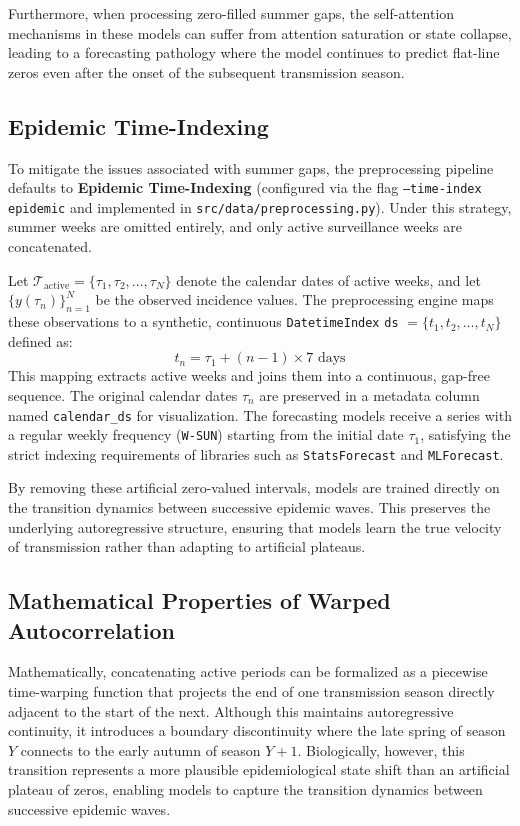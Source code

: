 Furthermore, when processing zero-filled summer gaps, the self-attention mechanisms in these models can suffer from attention saturation or state collapse, leading to a forecasting pathology where the model continues to predict flat-line zeros even after the onset of the subsequent transmission season.

\subsection{Epidemic Time-Indexing}
To mitigate the issues associated with summer gaps, the preprocessing pipeline defaults to \textbf{Epidemic Time-Indexing} (configured via the flag \texttt{--time-index epidemic} and implemented in \texttt{src/data/preprocessing.py}). Under this strategy, summer weeks are omitted entirely, and only active surveillance weeks are concatenated.

Let $\mathcal{T}_{\text{active}} = \{\tau_1, \tau_2, \dots, \tau_N\}$ denote the calendar dates of active weeks, and let $\{y(\tau_n)\}_{n=1}^N$ be the observed incidence values. The preprocessing engine maps these observations to a synthetic, continuous \texttt{DatetimeIndex} \texttt{ds} $= \{t_1, t_2, \dots, t_N\}$ defined as:
\begin{equation}
t_n = \tau_1 + (n - 1) \times 7 \text{ days}
\end{equation}
This mapping extracts active weeks and joins them into a continuous, gap-free sequence. The original calendar dates $\tau_n$ are preserved in a metadata column named \texttt{calendar\_ds} for visualization. The forecasting models receive a series with a regular weekly frequency (\texttt{W-SUN}) starting from the initial date $\tau_1$, satisfying the strict indexing requirements of libraries such as \texttt{StatsForecast} and \texttt{MLForecast}.

By removing these artificial zero-valued intervals, models are trained directly on the transition dynamics between successive epidemic waves. This preserves the underlying autoregressive structure, ensuring that models learn the true velocity of transmission rather than adapting to artificial plateaus.

\subsection{Mathematical Properties of Warped Autocorrelation}
Mathematically, concatenating active periods can be formalized as a piecewise time-warping function that projects the end of one transmission season directly adjacent to the start of the next. Although this maintains autoregressive continuity, it introduces a boundary discontinuity where the late spring of season $Y$ connects to the early autumn of season $Y+1$. Biologically, however, this transition represents a more plausible epidemiological state shift than an artificial plateau of zeros, enabling models to capture the transition dynamics between successive epidemic waves.

